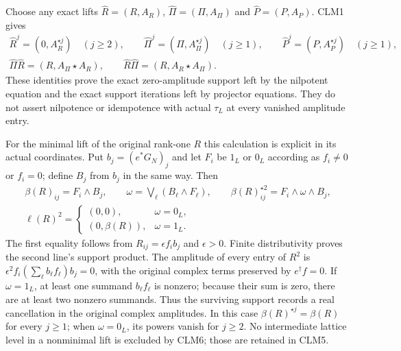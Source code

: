\documentclass[11pt]{article}
\begin{document}
Choose any exact lifts $\widehat R=(R,A_R)$,
$\widehat\Pi=(\Pi,A_\Pi)$ and $\widehat P=(P,A_P)$. CLM1 gives
\begin{equation}\tag{CLM5}
\begin{gathered}
\widehat R^{j}=(0,A_R^{\star j})\quad(j\ge2),\qquad
\widehat\Pi^{j}=(\Pi,A_\Pi^{\star j})\quad(j\ge1),\qquad
\widehat P^{j}=(P,A_P^{\star j})\quad(j\ge1),\\
\widehat\Pi\widehat R=(R,A_\Pi\star A_R),\qquad
\widehat R\widehat\Pi=(R,A_R\star A_\Pi).
\end{gathered}
\end{equation}
These identities prove the exact zero-amplitude support left by the
nilpotent equation and the exact support iterations left by projector
equations. They do not assert nilpotence or idempotence with actual
$\tau_L$ at every vanished amplitude entry.

For the minimal lift of the original rank-one $R$ this calculation
is explicit in its actual coordinates. Put $b_j=(e^*G_N)_j$ and let
$F_i$ be $1_L$ or $0_L$ according as $f_i\ne0$ or $f_i=0$; define
$B_j$ from $b_j$ in the same way. Then
\begin{equation}\tag{CLM6}
\begin{gathered}
\beta(R)_{ij}=F_i\wedge B_j,\qquad
\omega=\bigvee_\ell(B_\ell\wedge F_\ell),\qquad
\beta(R)^{\star2}_{ij}=F_i\wedge\omega\wedge B_j,\\
\ell(R)^2=
\begin{cases}(0,0),&\omega=0_L,\\
(0,\beta(R)),&\omega=1_L.
\end{cases}
\end{gathered}
\end{equation}
The first equality follows from $R_{ij}=\epsilon f_i b_j$ and
$\epsilon>0$. Finite distributivity proves the second line's support
product. The amplitude of every entry of $R^2$ is
$\epsilon^2 f_i(\sum_\ell b_\ell f_\ell)b_j=0$, with the original
complex terms preserved by $e^\dagger f=0$. If $\omega=1_L$, at least
one summand $b_\ell f_\ell$ is nonzero; because their sum is zero,
there are at least two nonzero summands. Thus the surviving support
records a real cancellation in the original complex amplitudes. In
this case $\beta(R)^{\star j}=\beta(R)$ for every $j\ge1$; when
$\omega=0_L$, its powers vanish for $j\ge2$. No intermediate lattice
level in a nonminimal lift is excluded by CLM6; those are retained in
CLM5.
\end{document}
